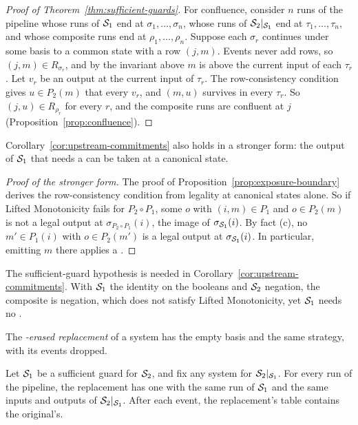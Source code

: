 \begin{proof}[Proof of Theorem~\ref{thm:sufficient-guards}]
For confluence, consider $n$ runs of the pipeline whose runs of $\mathcal{S}_1$ end
at $\sigma_1,\ldots,\sigma_n$, whose runs of $\mathcal{S}_2|_{\mathcal{S}_1}$ end at
$\tau_1,\ldots,\tau_n$, and whose composite runs end at
$\rho_1,\ldots,\rho_n$.  Suppose each $\sigma_r$ continues under some basis to
a common state with a row $(j,m)$.  Events never add rows, so $(j,m)\in
R_{\sigma_r}$, and by the invariant above $m$ is above the current input of
each $\tau_r$.  Let $v_r$ be an output at the current input of $\tau_r$.  The
row-consistency condition gives $u\in P_2(m)$ that \outrel every $v_r$, and
$(m,u)$ survives in every $\tau_r$.  So $(j,u)\in R_{\rho_r}$ for every $r$,
and the composite runs are confluent at $j$
(Proposition~\ref{prop:confluence}).
\end{proof}

Corollary~\ref{cor:upstream-commitments} also holds in a stronger form: the
output of $\mathcal{S}_1$ that needs a \commitment can be taken at a canonical state.

\begin{proof}[Proof of the stronger form]
The proof of Proposition~\ref{prop:exposure-boundary} derives the
row-consistency condition from legality at canonical states alone.  So if
Lifted Monotonicity fails for $P_2\circ P_1$, some $o$ with $(i,m)\in P_1$ and
$o\in P_2(m)$ is not a legal output at $\sigma_{P_2\circ P_1}(i)$, the image
of $\sigma_{\mathcal{S}_1}(i)$.  By fact (c), no $m'\in P_1(i)$ with $o\in P_2(m')$
is a legal output at $\sigma_{\mathcal{S}_1}(i)$.  In particular, emitting $m$
there applies a \commitment.
\end{proof}

The sufficient-guard hypothesis is needed in Corollary~\ref{cor:upstream-commitments}.  With $\mathcal{S}_1$ the identity on the booleans and
$\mathcal{S}_2$ negation, the composite is negation, which does not satisfy Lifted
Monotonicity, yet $\mathcal{S}_1$ needs no \commitment.

The \emph{\commitment-erased replacement} of a system has the empty basis and
the same strategy, with its \commitment events dropped.

\begin{corollary}
\label{cor:empty-store}
Let $\mathcal{S}_1$ be a sufficient guard for $\mathcal{S}_2$, and fix any system for $\mathcal{S}_2|_{\mathcal{S}_1}$.  For every run
of the pipeline, the replacement has one with the same run of $\mathcal{S}_1$ and
the same inputs and outputs of $\mathcal{S}_2|_{\mathcal{S}_1}$.  After each event, the
replacement's table contains the original's.
\end{corollary}

